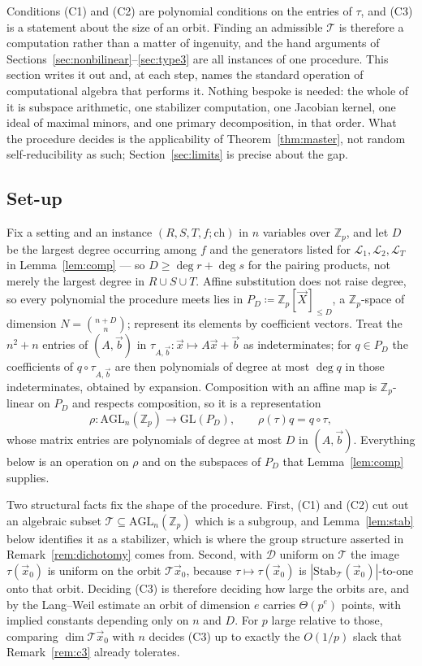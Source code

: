\documentclass{aicr-solution}
\newcommand{\Zp}{\mathbb{Z}_p}
\newcommand{\vx}{\vec{x}}
\newcommand{\vX}{\vec{X}}
\newcommand{\vb}{\vec{b}}
\newcommand{\LL}{\mathcal{L}}
\newcommand{\GL}{\mathrm{GL}}
\newcommand{\AGL}{\mathrm{AGL}}
\newcommand{\ch}{\mathrm{ch}}
\newcommand{\Stab}{\mathrm{Stab}}
\begin{document}
Conditions \textup{(C1)} and \textup{(C2)} are polynomial conditions on the entries of $\tau$,
and \textup{(C3)} is a statement about the size of an orbit. Finding an admissible $\mathcal T$
is therefore a computation rather than a matter of ingenuity, and the hand arguments of
Sections~\ref{sec:nonbilinear}--\ref{sec:type3} are all instances of one procedure. This
section writes it out and, at each step, names the standard operation of computational algebra
that performs it. Nothing bespoke is needed: the whole of it is subspace arithmetic, one
stabilizer computation, one Jacobian kernel, one ideal of maximal minors, and one primary
decomposition, in that order. What the procedure decides is the applicability of
Theorem~\ref{thm:master}, not random self-reducibility as such;
Section~\ref{sec:limits} is precise about the gap.

\subsection{Set-up}

Fix a setting and an instance $(R,S,T,f;\ch)$ in $n$ variables over $\Zp$, and let $D$ be the
largest degree occurring among $f$ and the generators listed for $\LL_1,\LL_2,\LL_T$ in
Lemma~\ref{lem:comp} --- so $D\ge\deg r+\deg s$ for the pairing products, not merely the
largest degree in $R\cup S\cup T$. Affine substitution does not raise
degree, so every polynomial the procedure meets lies in $P_D\coloneqq\Zp[\vX]_{\le D}$, a
$\Zp$-space of dimension $N=\binom{n+D}{n}$; represent its elements by coefficient vectors.
Treat the $n^{2}+n$ entries of $(A,\vb)$ in $\tau_{A,\vb}\colon\vx\mapsto A\vx+\vb$ as
indeterminates; for $q\in P_D$ the coefficients of $q\circ\tau_{A,\vb}$ are then polynomials of
degree at most $\deg q$ in those indeterminates, obtained by expansion. Composition with an
affine map is $\Zp$-linear on $P_D$ and respects composition, so it is a representation
\[
  \rho\colon\AGL_n(\Zp)\longrightarrow\GL(P_D),\qquad \rho(\tau)q=q\circ\tau,
\]
whose matrix entries are polynomials of degree at most $D$ in $(A,\vb)$. Everything below is an
operation on $\rho$ and on the subspaces of $P_D$ that Lemma~\ref{lem:comp} supplies.

Two structural facts fix the shape of the procedure. First, \textup{(C1)} and \textup{(C2)} cut
out an algebraic subset $\mathcal T\subseteq\AGL_n(\Zp)$ which is a subgroup, and
Lemma~\ref{lem:stab} below identifies it as a stabilizer, which is where the group structure
asserted in Remark~\ref{rem:dichotomy} comes from. Second, with $\mathcal D$ uniform on
$\mathcal T$ the image $\tau(\vx_0)$ is uniform on the orbit $\mathcal T\vx_0$, because
$\tau\mapsto\tau(\vx_0)$ is $|\Stab_{\mathcal T}(\vx_0)|$-to-one onto that orbit. Deciding
\textup{(C3)} is therefore deciding how large the orbits are, and by the Lang--Weil estimate an
orbit of dimension $e$ carries $\Theta(p^{e})$ points, with implied constants depending only on
$n$ and $D$. For $p$ large relative to those, comparing $\dim\mathcal T\vx_0$ with $n$ decides
\textup{(C3)} up to exactly the $O(1/p)$ slack that Remark~\ref{rem:c3} already tolerates.
\end{document}
